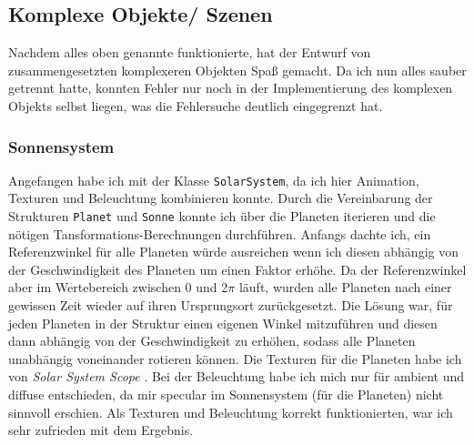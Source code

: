 \documentclass{article}
\let\oldsubsection\subsection
\renewcommand\subsection{\needspace{10\baselineskip}\oldsubsection}
\let\oldsubsubsection\subsubsection
\renewcommand\subsubsection{\needspace{7\baselineskip}\oldsubsubsection}
\begin{document}
\subsection{Komplexe Objekte/ Szenen} \label{sec:complex-objects}
Nachdem alles oben genannte funktionierte, hat der Entwurf von zusammengesetzten komplexeren Objekten Spaß gemacht.
Da ich nun alles sauber getrennt hatte, konnten Fehler nur noch in der Implementierung des komplexen Objekts selbst liegen, was die Fehlersuche deutlich eingegrenzt hat.

\subsubsection{Sonnensystem} \label{sec::solar-system}
Angefangen habe ich mit der Klasse \texttt{SolarSystem}, da ich hier Animation, Texturen und Beleuchtung kombinieren konnte.
Durch die Vereinbarung der Strukturen \texttt{Planet} und \texttt{Sonne} konnte ich über die Planeten iterieren und die nötigen Tansformations-Berechnungen durchführen.
Anfangs dachte ich, ein Referenzwinkel für alle Planeten würde ausreichen wenn ich diesen abhängig von der Geschwindigkeit des Planeten um einen Faktor erhöhe.
Da der Referenzwinkel aber im Wertebereich zwischen 0 und 2$\pi$ läuft, wurden alle Planeten nach einer gewissen Zeit wieder auf ihren Ursprungsort zurückgesetzt.
Die Lösung war, für jeden Planeten in der Struktur einen eigenen Winkel mitzuführen und diesen dann abhängig von der Geschwindigkeit zu erhöhen, sodass alle Planeten unabhängig voneinander rotieren können.
Die Texturen für die Planeten habe ich von \textit{Solar System Scope} \cite{solar-textures}.
Bei der Beleuchtung habe ich mich nur für ambient und diffuse entschieden, da mir specular im Sonnensystem (für die Planeten) nicht sinnvoll erschien.
Als Texturen und Beleuchtung korrekt funktionierten, war ich sehr zufrieden mit dem Ergebnis.
\end{document}
